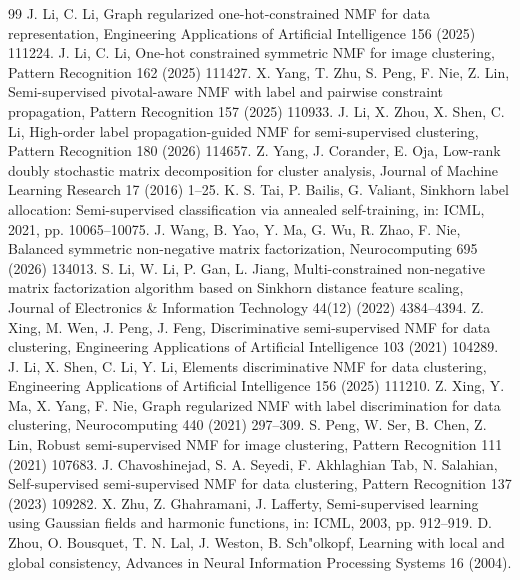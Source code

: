 \documentclass[times, review, 10pt]{elsarticle}
\begin{document}
\begin{thebibliography}{99}
 J. Li, C. Li, Graph regularized one-hot-constrained NMF for data representation, Engineering Applications of Artificial Intelligence 156 (2025) 111224.
 J. Li, C. Li, One-hot constrained symmetric NMF for image clustering, Pattern Recognition 162 (2025) 111427.
 X. Yang, T. Zhu, S. Peng, F. Nie, Z. Lin, Semi-supervised pivotal-aware NMF with label and pairwise constraint propagation, Pattern Recognition 157 (2025) 110933.
 J. Li, X. Zhou, X. Shen, C. Li, High-order label propagation-guided NMF for semi-supervised clustering, Pattern Recognition 180 (2026) 114657.
 Z. Yang, J. Corander, E. Oja, Low-rank doubly stochastic matrix decomposition for cluster analysis, Journal of Machine Learning Research 17 (2016) 1--25.
 K. S. Tai, P. Bailis, G. Valiant, Sinkhorn label allocation: Semi-supervised classification via annealed self-training, in: ICML, 2021, pp. 10065--10075.
 J. Wang, B. Yao, Y. Ma, G. Wu, R. Zhao, F. Nie, Balanced symmetric non-negative matrix factorization, Neurocomputing 695 (2026) 134013.
 S. Li, W. Li, P. Gan, L. Jiang, Multi-constrained non-negative matrix factorization algorithm based on Sinkhorn distance feature scaling, Journal of Electronics \& Information Technology 44(12) (2022) 4384--4394.
 Z. Xing, M. Wen, J. Peng, J. Feng, Discriminative semi-supervised NMF for data clustering, Engineering Applications of Artificial Intelligence 103 (2021) 104289.
 J. Li, X. Shen, C. Li, Y. Li, Elements discriminative NMF for data clustering, Engineering Applications of Artificial Intelligence 156 (2025) 111210.
 Z. Xing, Y. Ma, X. Yang, F. Nie, Graph regularized NMF with label discrimination for data clustering, Neurocomputing 440 (2021) 297--309.
 S. Peng, W. Ser, B. Chen, Z. Lin, Robust semi-supervised NMF for image clustering, Pattern Recognition 111 (2021) 107683.
 J. Chavoshinejad, S. A. Seyedi, F. Akhlaghian Tab, N. Salahian, Self-supervised semi-supervised NMF for data clustering, Pattern Recognition 137 (2023) 109282.
 X. Zhu, Z. Ghahramani, J. Lafferty, Semi-supervised learning using Gaussian fields and harmonic functions, in: ICML, 2003, pp. 912--919.
 D. Zhou, O. Bousquet, T. N. Lal, J. Weston, B. Sch"olkopf, Learning with local and global consistency, Advances in Neural Information Processing Systems 16 (2004).

\end{thebibliography}
\end{document}
